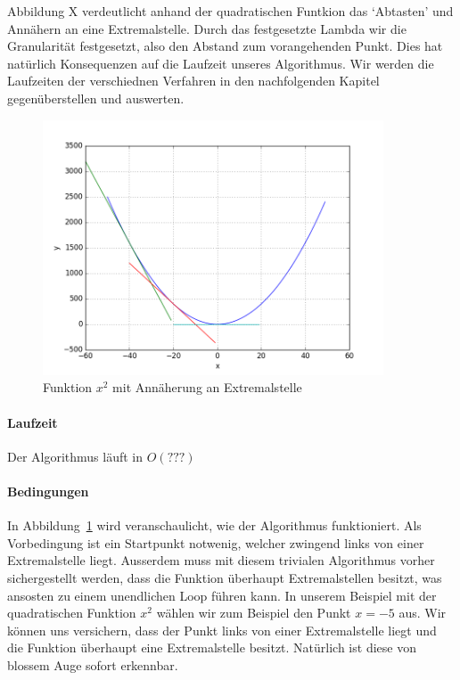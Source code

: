 \documentclass[10pt]{article}         %
\begin{document}
Abbildung X verdeutlicht anhand der quadratischen Funtkion das `Abtasten' und Annähern an eine Extremalstelle. Durch das festgesetzte Lambda wir die Granularität festgesetzt, also den Abstand zum vorangehenden Punkt. Dies hat natürlich Konsequenzen auf die Laufzeit unseres Algorithmus. Wir werden die Laufzeiten der verschiednen Verfahren in den nachfolgenden Kapitel gegenüberstellen und auswerten. 

\begin{figure}[!ht]
    \centering
    \includegraphics[width=0.9\textwidth]{gradient}
    \caption{Funktion $x^2$ mit Annäherung an Extremalstelle}\label{gradientx}
\end{figure}

\paragraph{Laufzeit}
Der Algorithmus läuft in $O(???)$

\paragraph{Bedingungen}
In Abbildung~\ref{gradientx} wird veranschaulicht, wie der Algorithmus funktioniert. Als Vorbedingung ist ein Startpunkt notwenig, welcher zwingend links von einer Extremalstelle liegt. Ausserdem muss mit diesem trivialen Algorithmus vorher sichergestellt werden, dass die Funktion überhaupt Extremalstellen besitzt, was ansosten zu einem unendlichen Loop führen kann. In unserem Beispiel mit der quadratischen Funktion $x^2$ wählen wir zum Beispiel den Punkt $x=-5$ aus. Wir können uns versichern, dass der Punkt links von einer Extremalstelle liegt und die Funktion überhaupt eine Extremalstelle besitzt. Natürlich ist diese von blossem Auge sofort erkennbar. 
\end{document}
